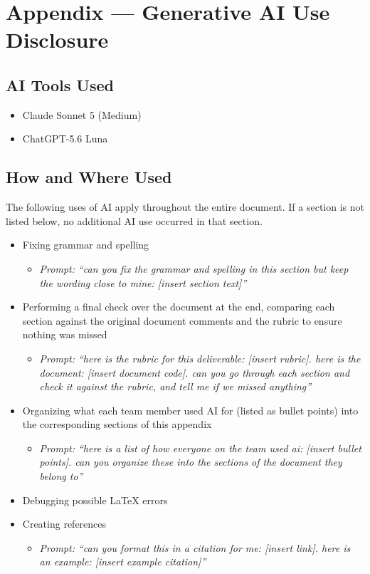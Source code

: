 \documentclass{article}
\begin{document}
\newpage{}

\section{Appendix --- Generative AI Use Disclosure}

\subsection{AI Tools Used}

\begin{itemize}
    \item Claude Sonnet 5 (Medium)
    \item ChatGPT-5.6 Luna
\end{itemize}

\subsection{How and Where Used}

The following uses of AI apply throughout the entire document. If a section is not listed below, no additional AI use occurred in that section.

\begin{itemize}
  \item Fixing grammar and spelling
  \begin{itemize}
    \item \textit{Prompt: ``can you fix the grammar and spelling in this section but keep the wording close to mine: [insert section text]''}
  \end{itemize}
  \item Performing a final check over the document at the end, comparing each section against the original document comments and the rubric to ensure nothing was missed
  \begin{itemize}
    \item \textit{Prompt: ``here is the rubric for this deliverable: [insert rubric]. here is the document: [insert document code]. can you go through each section and check it against the rubric, and tell me if we missed anything''}
  \end{itemize}
  \item Organizing what each team member used AI for (listed as bullet points) into the corresponding sections of this appendix
  \begin{itemize}
    \item \textit{Prompt: ``here is a list of how everyone on the team used ai: [insert bullet points]. can you organize these into the sections of the document they belong to''}
  \end{itemize}
  \item Debugging possible \LaTeX{} errors
  \item Creating references
  \begin{itemize}
    \item \textit{Prompt: ``can you format this in a citation for me: [insert link]. here is an example: [insert example citation]''}
  \end{itemize}
\end{itemize}
\end{document}
